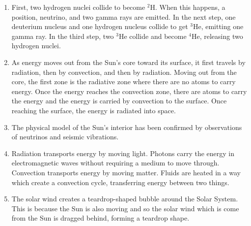 \documentclass[../hw2.tex]{subfiles}
\begin{document}

    \newcommand\usc[1]{${}^#1$}

    \begin{enumerate}
        \item {} First, two hydrogen nuclei collide to become \usc{2}H. When this happens, a position, neutrino, and two gamma rays are emitted. In the next step, one deuterium nucleus and one hydrogen nucleus collide to get \usc{3}He, emitting one gamma ray. In the third step, two \usc{3}He collide and become \usc{4}He, releasing two hydrogen nuclei.
        \item {} As energy moves out from the Sun's core toward its surface, it first travels by radiation, then by convection, and then by radiation. Moving out from the core, the first zone is the radiative zone where there are no atoms to carry energy. Once the energy reaches the convection zone, there are atoms to carry the energy and the energy is carried by convection to the surface. Once reaching the surface, the energy is radiated into space.
        \item {} The physical model of the Sun's interior has been confirmed by observations of neutrinos and seismic vibrations. %
        \item {} Radiation transports energy by moving light. Photons carry the energy in electromagnetic waves without requiring a medium to move through. Convection transports energy by moving matter. Fluids are heated in a way which create a convection cycle, transferring energy between two things. 
        \item {} The solar wind creates a teardrop-shaped bubble around the Solar System. This is because the Sun is also moving and so the solar wind which is come from the Sun is dragged behind, forming a teardrop shape.%
    \end{enumerate}
    
\end{document}
